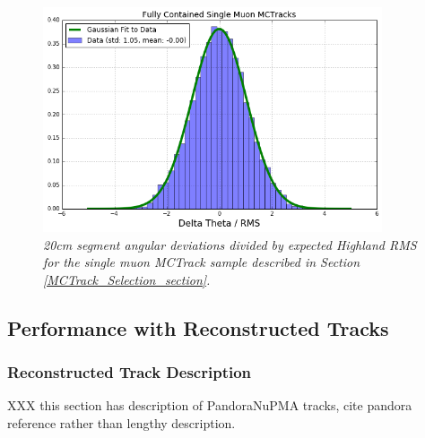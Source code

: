\begin{figure}[h!]
\begin{center}
\includegraphics[width=100mm]{Figures/Highland_validation_MCTracks.png}
\end{center}
\caption{\textit{20cm segment angular deviations divided by expected Highland RMS for the single muon {\sc MCTrack} sample described in Section \ref{MCTrack_Selection_section}.}}
\label{Highland_validation_MCTracks_fig}
\end{figure}









\subsection{Performance with Reconstructed Tracks}
\subsubsection{Reconstructed Track Description}\label{RecoTrack_section}
XXX this section has description of PandoraNuPMA tracks, cite pandora reference rather than lengthy description.

